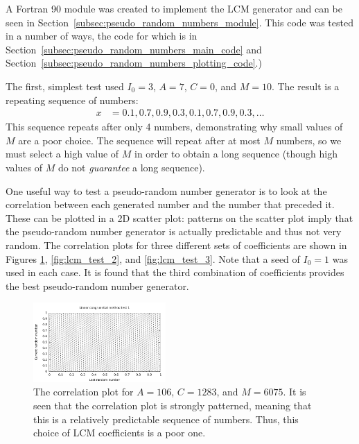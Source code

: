 \documentclass[twocolumn]{myarticle}
\begin{document}
A Fortran 90 module was created to implement the LCM generator and can be seen in Section~\ref{subsec:pseudo_random_numbers_module}.
This code was tested in a number of ways, the code for which is in Section~\ref{subsec:pseudo_random_numbers_main_code} and Section~\ref{subsec:pseudo_random_numbers_plotting_code}.)

The first, simplest test used $ I_0 = 3 $, $ A = 7 $, $ C = 0 $, and $ M = 10 $.
The result is a repeating sequence of numbers:
\begin{align}
    x &= 0.1, 0.7, 0.9, 0.3, 0.1, 0.7, 0.9, 0.3, \ldots
\end{align}
This sequence repeats after only 4 numbers, demonstrating why small values of $ M $ are a poor choice.
The sequence will repeat after at most $ M $ numbers, so we must select a high value of $ M $ in order to obtain a long sequence (though high values of $ M $ do not \emph{guarantee} a long sequence).

One useful way to test a pseudo-random number generator is to look at the correlation between each generated number and the number that preceded it.
These can be plotted in a 2D scatter plot: patterns on the scatter plot imply that the pseudo-random number generator is actually predictable and thus not very random.
The correlation plots for three different sets of coefficients are shown in Figures \ref{fig:lcm_test_1}, \ref{fig:lcm_test_2}, and \ref{fig:lcm_test_3}.
Note that a seed of $ I_0 = 1 $ was used in each case.
It is found that the third combination of coefficients provides the best pseudo-random number generator.

\begin{figure}[ht!]
    \begin{center}
    \includegraphics[width = 0.45\textwidth]{../Plots/LCM_test_1.pdf}
    \caption{%
        The correlation plot for $ A = 106 $, $ C = 1283 $, and $ M = 6075 $.
        It is seen that the correlation plot is strongly patterned, meaning that this is a relatively predictable sequence of numbers.
        Thus, this choice of LCM coefficients is a poor one.
    }
    \label{fig:lcm_test_1}
    \end{center}
\end{figure}
\end{document}

